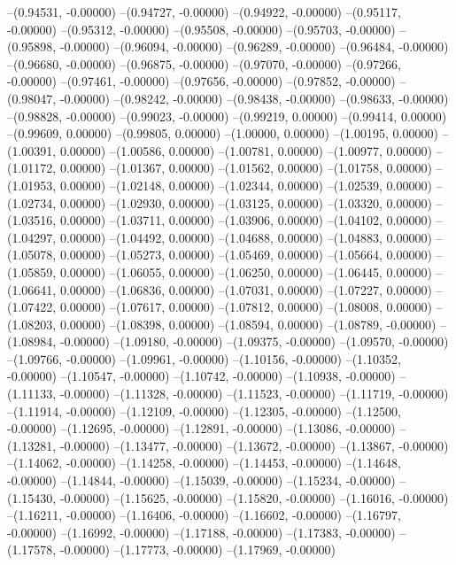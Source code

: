 --(0.94531, -0.00000)
--(0.94727, -0.00000)
--(0.94922, -0.00000)
--(0.95117, -0.00000)
--(0.95312, -0.00000)
--(0.95508, -0.00000)
--(0.95703, -0.00000)
--(0.95898, -0.00000)
--(0.96094, -0.00000)
--(0.96289, -0.00000)
--(0.96484, -0.00000)
--(0.96680, -0.00000)
--(0.96875, -0.00000)
--(0.97070, -0.00000)
--(0.97266, -0.00000)
--(0.97461, -0.00000)
--(0.97656, -0.00000)
--(0.97852, -0.00000)
--(0.98047, -0.00000)
--(0.98242, -0.00000)
--(0.98438, -0.00000)
--(0.98633, -0.00000)
--(0.98828, -0.00000)
--(0.99023, -0.00000)
--(0.99219, 0.00000)
--(0.99414, 0.00000)
--(0.99609, 0.00000)
--(0.99805, 0.00000)
--(1.00000, 0.00000)
--(1.00195, 0.00000)
--(1.00391, 0.00000)
--(1.00586, 0.00000)
--(1.00781, 0.00000)
--(1.00977, 0.00000)
--(1.01172, 0.00000)
--(1.01367, 0.00000)
--(1.01562, 0.00000)
--(1.01758, 0.00000)
--(1.01953, 0.00000)
--(1.02148, 0.00000)
--(1.02344, 0.00000)
--(1.02539, 0.00000)
--(1.02734, 0.00000)
--(1.02930, 0.00000)
--(1.03125, 0.00000)
--(1.03320, 0.00000)
--(1.03516, 0.00000)
--(1.03711, 0.00000)
--(1.03906, 0.00000)
--(1.04102, 0.00000)
--(1.04297, 0.00000)
--(1.04492, 0.00000)
--(1.04688, 0.00000)
--(1.04883, 0.00000)
--(1.05078, 0.00000)
--(1.05273, 0.00000)
--(1.05469, 0.00000)
--(1.05664, 0.00000)
--(1.05859, 0.00000)
--(1.06055, 0.00000)
--(1.06250, 0.00000)
--(1.06445, 0.00000)
--(1.06641, 0.00000)
--(1.06836, 0.00000)
--(1.07031, 0.00000)
--(1.07227, 0.00000)
--(1.07422, 0.00000)
--(1.07617, 0.00000)
--(1.07812, 0.00000)
--(1.08008, 0.00000)
--(1.08203, 0.00000)
--(1.08398, 0.00000)
--(1.08594, 0.00000)
--(1.08789, -0.00000)
--(1.08984, -0.00000)
--(1.09180, -0.00000)
--(1.09375, -0.00000)
--(1.09570, -0.00000)
--(1.09766, -0.00000)
--(1.09961, -0.00000)
--(1.10156, -0.00000)
--(1.10352, -0.00000)
--(1.10547, -0.00000)
--(1.10742, -0.00000)
--(1.10938, -0.00000)
--(1.11133, -0.00000)
--(1.11328, -0.00000)
--(1.11523, -0.00000)
--(1.11719, -0.00000)
--(1.11914, -0.00000)
--(1.12109, -0.00000)
--(1.12305, -0.00000)
--(1.12500, -0.00000)
--(1.12695, -0.00000)
--(1.12891, -0.00000)
--(1.13086, -0.00000)
--(1.13281, -0.00000)
--(1.13477, -0.00000)
--(1.13672, -0.00000)
--(1.13867, -0.00000)
--(1.14062, -0.00000)
--(1.14258, -0.00000)
--(1.14453, -0.00000)
--(1.14648, -0.00000)
--(1.14844, -0.00000)
--(1.15039, -0.00000)
--(1.15234, -0.00000)
--(1.15430, -0.00000)
--(1.15625, -0.00000)
--(1.15820, -0.00000)
--(1.16016, -0.00000)
--(1.16211, -0.00000)
--(1.16406, -0.00000)
--(1.16602, -0.00000)
--(1.16797, -0.00000)
--(1.16992, -0.00000)
--(1.17188, -0.00000)
--(1.17383, -0.00000)
--(1.17578, -0.00000)
--(1.17773, -0.00000)
--(1.17969, -0.00000)
